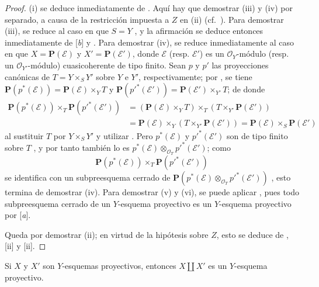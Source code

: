 \documentclass[oneside,10pt]{amsart}
\let\EGAOriginalLabel\label
\renewcommand{\label}[1]{\phantomsection\EGAOriginalLabel{#1}}
\begin{document}
\begin{proof}
(i) se deduce inmediatamente de .
Aquí hay que demostrar (iii) y (iv) por separado, a causa de la restricción impuesta a $Z$ en (ii) (cf.~).
Para demostrar (iii), se reduce al caso en que $S=Y$ , y la afirmación se deduce entonces inmediatamente de [\emph{b}] y .
Para demostrar (iv), se reduce inmediatamente al caso en que $X=\mathbf{P}(\mathcal{E})$ y $X'=\mathbf{P}(\mathcal{E}')$, donde $\mathcal{E}$ (resp. $\mathcal{E}'$) es un $\mathcal{O}_Y$-módulo (resp. un $\mathcal{O}_{Y'}$-módulo) cuasicoherente de tipo finito.
Sean $p$ y $p'$ las proyecciones canónicas de $T=Y\times_SY'$ sobre $Y$ e $Y'$, respectivamente; por , se tiene $\mathbf{P}(p^*(\mathcal{E}))=\mathbf{P}(\mathcal{E})\times_YT$ y $\mathbf{P}(p'^*(\mathcal{E}'))=\mathbf{P}(\mathcal{E}')\times_{Y'}T$; de donde
\begin{align*}
\mathbf{P}(p^*(\mathcal{E}))\times_T\mathbf{P}(p'^*(\mathcal{E}'))
&=(\mathbf{P}(\mathcal{E})\times_YT)\times_T
(T\times_{Y'}\mathbf{P}(\mathcal{E}'))\\
&=\mathbf{P}(\mathcal{E})\times_Y
(T\times_{Y'}\mathbf{P}(\mathcal{E}'))
=\mathbf{P}(\mathcal{E})\times_S\mathbf{P}(\mathcal{E}')
\end{align*}
al sustituir $T$ por $Y\times_SY'$ y utilizar .
Pero $p^*(\mathcal{E})$ y $p'^*(\mathcal{E}')$ son de tipo finito sobre $T$ , y por tanto también lo es $p^*(\mathcal{E})\otimes_{\mathcal{O}_T}p'^*(\mathcal{E}')$;
como \[
\mathbf{P}(p^*(\mathcal{E}))\times_T\mathbf{P}(p'^*(\mathcal{E}'))
\] se identifica con un subpreesquema cerrado de $\mathbf{P}(p^*(\mathcal{E})\otimes_{\mathcal{O}_T}p'^*(\mathcal{E}'))$ , esto termina de demostrar (iv).
Para demostrar (v) y (vi), se puede aplicar , pues todo subpreesquema cerrado de un $Y$-esquema proyectivo es un $Y$-esquema proyectivo por [\emph{a}].

Queda por demostrar (ii); en virtud de la hipótesis sobre $Z$, esto se deduce de , [ii] y [ii].
\end{proof}

\begin{proposition}[5.5.6]
\label{II.5.5.6-fr}
Si $X$ y $X'$ son $Y$-esquemas proyectivos, entonces $X\amalg X'$ es un $Y$-esquema proyectivo.
\end{proposition}
\end{document}

